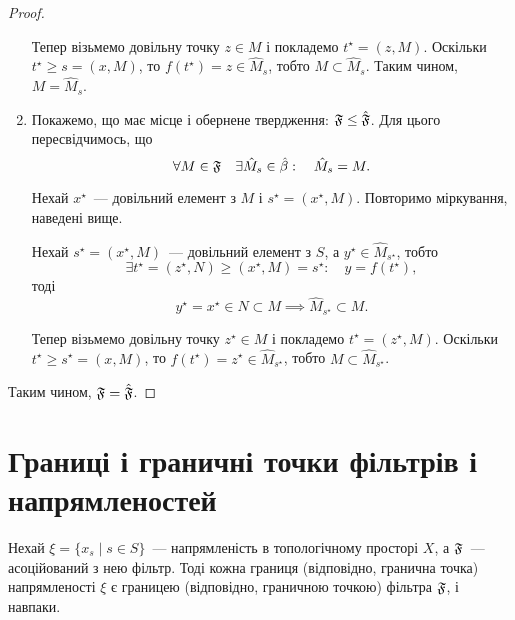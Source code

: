 \begin{proof}
\begin{enumerate}
        Тепер візьмемо довільну точку $z \in M$ і покладемо $t^\star = (z, M)$. Оскільки $t^\star \ge s = (x, M)$, то $f(t^\star) = z \in \hat M_s$, тобто $M \subset \hat M_s$. Таким чином, $M = \hat M_s$.

        \item Покажемо, що має місце і обернене твердження: $\frak F \le \hat{\frak F}$. Для цього пересвідчимось, що
        \begin{equation*}
            \forall M \in \frak F \quad
            \exists \hat M_s \in \hat \beta: \quad
            \hat M_s = M.
        \end{equation*}

        Нехай $x^\star$~--- довільний елемент з $M$ і $s^\star = (x^\star, M)$. Повторимо міркування, наведені вище. \medskip

        Нехай $s^\star = (x^\star, M)$~--- довільний елемент з $S$, а $y^\star \in \hat M_{s^\star}$, тобто
        \begin{equation*}
            \exists t^\star = (z^\star, N) \ge (x^\star, M) = s^\star: \quad y = f(t^\star),
        \end{equation*}
        тоді
        \begin{equation*}
            y^\star = x^\star \in N \subset M \implies \hat M_{s^\star} \subset M.
        \end{equation*}

        Тепер візьмемо довільну точку $z^\star \in M$ і покладемо $t^\star = (z^\star, M)$. Оскільки $t^\star \ge s^\star = (x, M)$, то $f(t^\star) = z^\star \in \hat M_{s^\star}$, тобто $M \subset \hat M_{s^\star}$.
    \end{enumerate}
    
    Таким чином, $\frak F = \hat{\frak F}$.
\end{proof}

\section{Границі і граничні точки фільтрів і напрямленостей}

\begin{theorem}
    Нехай $\xi = \{x_s \mid s \in S\}$~--- напрямленість в топологічному просторі $X$, а $\frak F$~--- асоційований з нею фільтр. Тоді кожна границя (відповідно, гранична точка) напрямленості $\xi$ є границею (відповідно, граничною точкою) фільтра $\frak F$, і навпаки.
\end{theorem}

